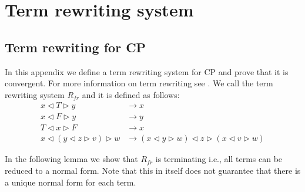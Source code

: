 \documentclass[a4paper,twoside,openright]{report}
\newcommand{\lef}{\ensuremath{\triangleleft}}
\newcommand{\rig}{\ensuremath{\triangleright}}
\begin{document}
\chapter{Term rewriting system}

\section{Term rewriting for CP}
In this appendix we define a term rewriting system for CP and prove that it is convergent. For more information on term rewriting see \cite{rewriting}. We call the term rewriting system $R_{fr}$ and it is defined as follows:
\begin{align*}
x\lef T\rig y &\to x\\
x\lef F\rig y &\to y\\
T\lef x\rig F &\to x\\
x\lef(y\lef z\rig v)\rig w &\to (x\lef y\rig w)\lef z\rig(x\lef v\rig w)
\end{align*}

In the following lemma we show that $R_{fr}$ is terminating i.e., all terms can be reduced to a normal form. Note that this in itself does not guarantee that there is a unique normal form for each term.
\end{document}
